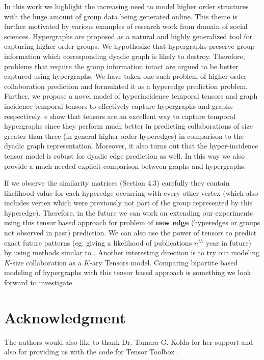 \documentclass{sig-alternate}
\begin{document}
In this work we highlight the increasing need to model higher order structures with the huge amount of group data being generated online. This theme is further motivated by various examples of research work from domain of social sciences. Hypergraphs are proposed as a natural and highly generalized tool for capturing higher order groups. We hypothesize that hypergraphs preserve group information which corresponding dyadic graph is likely to destroy. Therefore, problems that require the group information intact are argued to be better captured using hypergraphs. We have taken one such problem of higher order collaboration prediction and formulated it as a hyperedge prediction problem. Further, we propose a novel model of hyperincidence temporal tensors and graph incidence temporal tensors to effectively capture hypergraphs and graphs respectively. e show that tensors are an excellent way to capture temporal hypergraphs since they perform much better in predicting collaborations of size greater than three (in general higher order hyperedges) in comparison to the dyadic graph representation. Moreover, it also turns out that the hyper-incidence tensor model is robust for dyadic edge prediction as well. In this way we also provide a much needed explicit comparison between graphs and hypergraphs. 

If we observe the similarity matrices (Section 4.3) carefully they contain likelihood value for each hyperedge occurring with every other vertex (which also includes vertex which were previously not part of the group represented by this hyperedge). Therefore, in the future we can work on extending our experiments using this tensor based approach for problem of \textbf{new edge} (hyperedges or groups not observed in past) prediction. We can also use the power of tensors to predict exact future patterns (eg: giving a likelihood of publications $n^{th}$ year in future) by using methods similar to \cite{kolda11}. Another interesting direction is to try out modeling $K$-size collaboration as a $K$-ary Tensors model. Comparing bipartite based modeling of hypergraphs with this tensor based approach is something we look forward to investigate.


\section*{Acknowledgment}

The authors would also like to thank Dr. Tamara G. Kolda for her support and also for providing us with the code for Tensor Toolbox \cite{kolda07}. 


%


\end{document}
